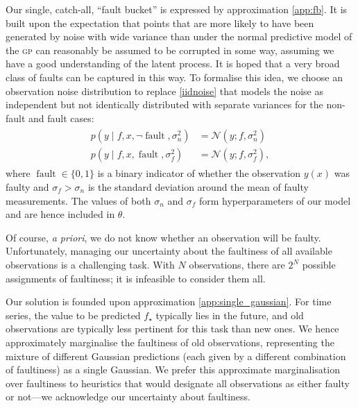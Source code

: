 \documentclass[twoside]{article}
\newcommand{\deq}{=}
\newcommand{\given}{\!\ensuremath{\mid}\!}
\newcommand{\cm}[1]{\ensuremath{\mathcal{#1}}}
\newcommand{\acro}[1]{\textsc{\MakeLowercase{#1}}}
\newcommand{\st}{_{\star}}
\DeclareMathOperator{\fault}{fault}
\begin{document}
Our single, catch-all, ``fault bucket'' is expressed by approximation \ref{app:fb}. It is built upon the expectation that points that are more likely to have been generated by noise with wide variance than under the normal
predictive model of the \acro{gp} can reasonably be assumed to
be corrupted in some way, assuming we have a good understanding of the
latent process. It is hoped that a very broad class of faults can be
captured in this way. 
To formalise this idea, we choose an observation noise distribution to
replace \eqref{iidnoise} that models the noise as independent
but not identically distributed with separate variances for the
non-fault and fault cases:
\begin{align}
\begin{split}\label{eq:observation_likelihood}
  p(y \given f, x, \neg\fault, \sigma_n^2)
 &
 \deq
 \cm{N}(y; f, \sigma_n^2)
 \\
 p(y \given f, x, \fault, \sigma_f^2)
 &
 \deq
 \cm{N}(y; f, \sigma_f^2),
\end{split}
\end{align}
where $\fault \in \lbrace 0, 1 \rbrace$ is a binary indicator of
whether the observation $y(x)$ was faulty and $\sigma_f > \sigma_n$ is
the standard deviation around the mean of faulty measurements.  The
values of both $\sigma_n$ and $\sigma_f$ form hyperparameters of our
model and are hence included in $\theta$.

Of course, {\it a priori}, we do not know whether an
observation will be faulty.  Unfortunately, managing our uncertainty
about the faultiness of all available observations is a
challenging task. With $N$ observations, there are $2^N$
possible assignments of faultiness; it is infeasible to consider them all.

Our solution is founded upon approximation \ref{app:single_gaussian}. 
For time series, the value to be predicted $f\st$
typically lies in the future, and old observations are
typically less pertinent for this task than new ones. We hence approximately marginalise the faultiness of old observations, representing the mixture of different Gaussian predictions (each given by a different combination of faultiness) as a single Gaussian.
We prefer this approximate marginalisation over
faultiness to heuristics that would designate all
observations as either faulty or not---we acknowledge our
uncertainty about faultiness.
\end{document}
